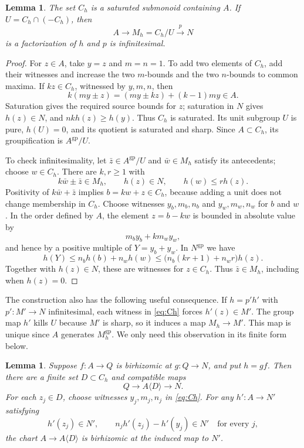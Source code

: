 \documentclass[11pt]{article}
\newtheorem{lemma}[theorem]{Lemma}
\theoremstyle{definition}
\theoremstyle{remark}
\newcommand{\gp}{\mathrm{gp}}
\begin{document}
\begin{lemma}\label{lem:infinitesimal}
The set $C_h$ is a saturated submonoid containing $A$. If $U=C_h\cap(-C_h)$, then
\[
 A\longrightarrow M_h=C_h/U\xrightarrow{p}N
\]
is a factorization of $h$ and $p$ is infinitesimal.
\end{lemma}

\begin{proof}
For $z\in A$, take $y=z$ and $m=n=1$. To add two elements of $C_h$, add their witnesses and increase the two $m$-bounds and the two $n$-bounds to common maxima. If $kz\in C_h$, witnessed by $y,m,n$, then
\[
 k(my\pm z)=(my\pm kz)+(k-1)my\in A.
\]
Saturation gives the required source bounds for $z$; saturation in $N$ gives $h(z)\in N$, and $nkh(z)\geq h(y)$. Thus $C_h$ is saturated. Its unit subgroup $U$ is pure, $h(U)=0$, and its quotient is saturated and sharp. Since $A\subset C_h$, its groupification is $A^{\gp}/U$.

To check infinitesimality, let $\bar z\in A^{\gp}/U$ and $\bar w\in M_h$ satisfy its antecedents; choose $w\in C_h$. There are $k,r\geq1$ with
\[
 k\bar w\pm\bar z\in M_h,\qquad
 h(z)\in N,\qquad h(w)\leq rh(z).
\]
Positivity of $k\bar w+\bar z$ implies $b=kw+z\in C_h$, because adding a unit does not change membership in $C_h$. Choose witnesses $y_b,m_b,n_b$ and $y_w,m_w,n_w$ for $b$ and $w$. In the order defined by $A$, the element $z=b-kw$ is bounded in absolute value by
\[
 m_by_b+km_wy_w,
\]
and hence by a positive multiple of $Y=y_b+y_w$. In $N^{\gp}$ we have
\[
 h(Y)\leq n_bh(b)+n_wh(w)
 \leq\bigl(n_b(kr+1)+n_wr\bigr)h(z).
\]
Together with $h(z)\in N$, these are witnesses for $z\in C_h$. Thus $\bar z\in M_h$, including when $h(z)=0$.
\end{proof}

The construction also has the following useful consequence. If $h=p'h'$ with $p':M'\to N$ infinitesimal, each witness in \eqref{eq:Ch} forces $h'(z)\in M'$. The group map $h'$ kills $U$ because $M'$ is sharp, so it induces a map $M_h\to M'$. This map is unique since $A$ generates $M_h^{\gp}$. We only need this observation in its finite form below.

\begin{lemma}\label{lem:certificates}
Suppose $f:A\to Q$ is birhizomic at $g:Q\to N$, and put $h=gf$. Then there are a finite set $D\subset C_h$ and compatible maps
\[
 Q\longrightarrow A\langle D\rangle\longrightarrow N.
\]
For each $z_j\in D$, choose witnesses $y_j,m_j,n_j$ in \eqref{eq:Ch}. For any $h':A\to N'$ satisfying
\begin{equation}\label{eq:certificate}
 h'(z_j)\in N',\qquad n_jh'(z_j)-h'(y_j)\in N'
 \quad\text{for every }j,
\end{equation}
the chart $A\to A\langle D\rangle$ is birhizomic at the induced map to $N'$.
\end{lemma}
\end{document}
